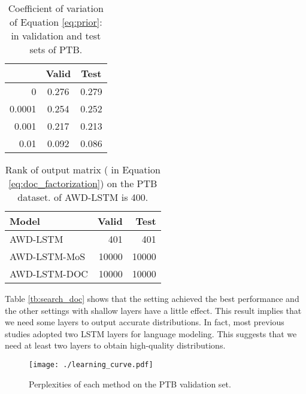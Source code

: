 \documentclass[11pt,a4paper]{article}
\begin{document}
\begin{table}[!t]
  \centering
  \small
  \begin{tabular}{| r | c c |} \hline
  \multicolumn{1}{|c|}{  } & Valid & Test \\ \hline
  0 & 0.276 & 0.279 \\
  0.0001 & 0.254 & 0.252 \\
  0.001 & 0.217 & 0.213 \\
  0.01 & 0.092 & 0.086 \\ \hline
  \end{tabular}
  \caption{Coefficient of variation of Equation \ref{eq:prior}:  in validation and test sets of PTB.\label{tb:cv}}
\end{table}

\begin{table}[!t]
  \centering
  \small
  \begin{tabular}{| l | r r |} \hline
  Model & Valid & Test \\ \hline
  AWD-LSTM & 401 & 401 \\
  AWD-LSTM-MoS & 10000 & 10000 \\
  AWD-LSTM-DOC & 10000 & 10000 \\ \hline
  \end{tabular}
  \caption{Rank of output matrix ( in Equation \ref{eq:doc_factorization}) on the PTB dataset.  of AWD-LSTM is 400.\label{tb:output_rank}}
\end{table}

Table \ref{tb:search_doc} shows that the  setting achieved the best performance and the other settings with shallow layers have a little effect.
This result implies that we need some layers to output accurate distributions.
In fact, most previous studies adopted two LSTM layers for language modeling.
This suggests that we need at least two layers to obtain high-quality distributions.



\begin{figure}[!t]
  \centering
  \texttt{[image: ./learning\_curve.pdf]}
   \caption{Perplexities of each method on the PTB validation set.\label{fig:learning_curve}}
\end{figure}
\end{document}

